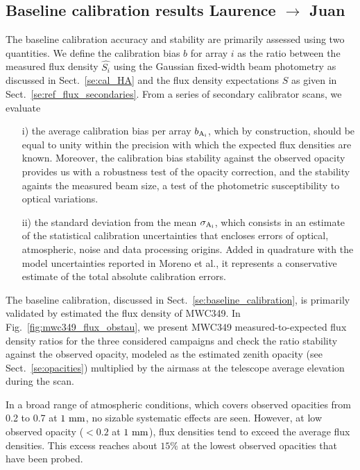 %
%
%
\subsection{Baseline calibration results {\color{blue} Laurence $\rightarrow$ Juan}}

The baseline calibration accuracy and stability are primarily assessed
using two quantities. We define the calibration bias $b$ for array $i$ as
the ratio between the measured flux density $\hat{S_{i}}$ using the
Gaussian fixed-width beam photometry as discussed in
Sect.~\ref{se:cal_HA} and the flux density expectations $\hat{S}$ as
given in Sect.~\ref{se:ref_flux_secondaries}. From a series of
secondary calibrator scans, we evaluate
\begin{itemize}
\item[i)] the average calibration bias per array $b_{\rm A_i}$,
  which by construction, should be equal to unity within the precision
  with which the expected flux densities are known. Moreover, 
  the calibration bias stability against the observed opacity provides
  us with a robustness test of the opacity correction, and the stability
  againts the measured beam size, a test of the photometric
  susceptibility to optical variations. %
\item[ii)] the standard deviation from the mean $\sigma_{\rm A_i}$,
  which consists in an estimate of the statistical calibration
  uncertainties that encloses errors of optical, atmospheric, noise
  and data processing origins. Added in quadrature with the model
  uncertainties reported in Moreno et al., it represents a
  conservative estimate of the total absolute calibration errors.
\end{itemize}


The baseline calibration, discussed in Sect.~\ref{se:baseline_calibration}, is primarily
validated by estimated the flux density of MWC349. In
Fig.~\ref{fig:mwc349_flux_obstau}, we present MWC349
measured-to-expected flux density ratios for the three considered
campaigns and check the ratio stability against the observed opacity,
modeled as the estimated zenith opacity (see Sect.~\ref{se:opacities}) multiplied
by the airmass at the telescope average elevation during the scan. 


In a broad range of atmospheric conditions, which covers observed opacities from 0.2 to
0.7 at $1~\rm{mm}$, no sizable systematic effects are seen. However, at low observed
opacity ($<0.2$ at $1~\rm{mm}$), flux densities tend to exceed
the average flux densities. This excess reaches about $15\%$ at the
lowest observed opacities that have been probed.

